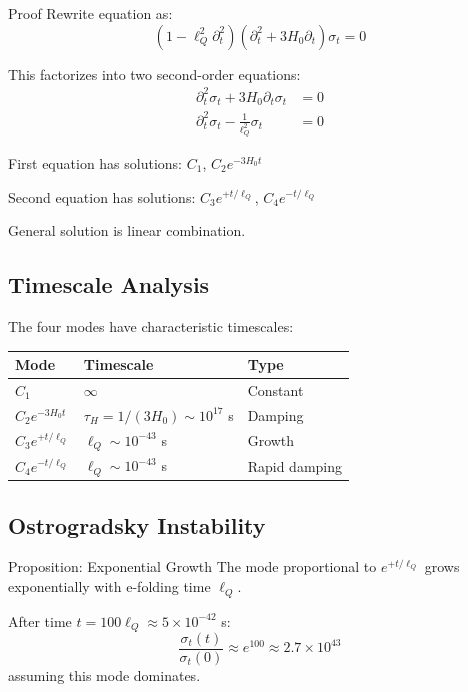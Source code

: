 \documentclass[11pt,a4paper]{article}
\theoremstyle{definition}
\theoremstyle{remark}
\begin{document}
	Proof
		Rewrite equation as:
		\begin{equation}
			(1 - \ell_Q^2\partial_t^2)(\partial_t^2 + 3H_0\partial_t)\sigma_t = 0
		\end{equation}
		
		This factorizes into two second-order equations:
		\begin{align}
			\partial_t^2\sigma_t + 3H_0\partial_t\sigma_t &= 0\\
			\partial_t^2\sigma_t - \frac{1}{\ell_Q^2}\sigma_t &= 0
		\end{align}
		
		First equation has solutions: $C_1$, $C_2 e^{-3H_0 t}$
		
		Second equation has solutions: $C_3 e^{+t/\ell_Q}$, $C_4 e^{-t/\ell_Q}$
		
		General solution is linear combination.
	
	\subsection{Timescale Analysis}
	
	The four modes have characteristic timescales:
	
	\begin{table}[h]
		\centering
		\begin{tabular}{@{}lll@{}}
			\toprule
			\textbf{Mode} & \textbf{Timescale} & \textbf{Type} \\
			\midrule
			$C_1$ & $\infty$ & Constant \\
			$C_2 e^{-3H_0 t}$ & $\tau_H = 1/(3H_0) \sim 10^{17}$ s & Damping \\
			$C_3 e^{+t/\ell_Q}$ & $\ell_Q \sim 10^{-43}$ s & Growth \\
			$C_4 e^{-t/\ell_Q}$ & $\ell_Q \sim 10^{-43}$ s & Rapid damping \\
			\bottomrule
		\end{tabular}
	\end{table}
	
	\subsection{Ostrogradsky Instability}
	
	Proposition: Exponential Growth
		The mode proportional to $e^{+t/\ell_Q}$ grows exponentially with e-folding time $\ell_Q$.
		
		After time $t = 100\ell_Q \approx 5 \times 10^{-42}$ s:
		\begin{equation}
			\frac{\sigma_t(t)}{\sigma_t(0)} \approx e^{100} \approx 2.7 \times 10^{43}
		\end{equation}
		assuming this mode dominates.
	
\end{document}
